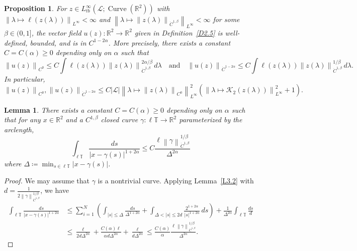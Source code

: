 \documentclass[reqno,centertags,12pt]{amsart}
\newtheorem{proposition}[theorem]{Proposition}
\newtheorem{lemma}[theorem]{Lemma}
\theoremstyle{definition}
\numberwithin{equation}{section}
\newcommand{\abs}[1]{\left\lvert#1\right\rvert}
\newcommand{\norm}[1]{\left\|#1\right\|}
\newcommand{\bbR}{{\mathbb{R}}}
\newcommand{\bbT}{{\mathbb{T}}}
\begin{document}
\begin{proposition}\label{P4.2}
    For $z\in L_{tb}^{\infty}(\mathcal{L};\operatorname{Curve}(\bbR^{2}))$ with
    $\norm{\lambda\mapsto\ell(z(\lambda))}_{L^{\infty}} < \infty$ and
    $\norm{\lambda\mapsto\norm{z(\lambda)}_{\dot{C}^{1,\beta}}}_{L^{\infty}} < \infty$
    for some $\beta\in(0,1]$, the vector field $u(z)\colon\bbR^{2}\to\bbR^{2}$ given in
    Definition~\ref{D2.5} is well-defined, bounded, and is in $C^{1-2\alpha}$.
    More precisely, there exists a constant $C=C(\alpha)\geq 0$
    depending only on $\alpha$ such that
    \[
        \norm{u(z)}_{C^{0}} \leq C\int\ell(z(\lambda))
        \norm{z(\lambda)}_{\dot{C}^{1,\beta}}^{2\alpha/\beta}\,d\lambda
        \quad\textrm{and}\quad
        \norm{u(z)}_{\dot{C}^{1-2\alpha}}
        \leq C\int\ell(z(\lambda))
        \norm{z(\lambda)}_{\dot{C}^{1,\beta}}^{1/\beta}\,d\lambda.
    \]
    In particular,
    \[
        \norm{u(z)}_{C^{0}}, \norm{u(z)}_{\dot{C}^{1-2\alpha}}
        \leq C\abs{\mathcal{L}}
        \norm{\lambda\mapsto\norm{z(\lambda)}_{C^{0}}}_{L^{\infty}}^{2}
        \left(
            \norm{\lambda\mapsto\mathcal{K}_{2}(z(\lambda))}_{L^{\infty}}^{2} + 1
        \right).
    \]
\end{proposition}

\begin{lemma}\label{L4.3}
    There exists a constant $C=C(\alpha)\geq 0$ depending only on $\alpha$ such that
    for any $x\in\bbR^{2}$ and a $C^{1,\beta}$ closed curve
    $\gamma\colon\ell\bbT\to\bbR^{2}$ parameterized by the arclength,
    \[
        \int_{\ell\bbT}\frac{ds}{\abs{x - \gamma(s)}^{1+2\alpha}}
        \leq C\frac{\ell\norm{\gamma}_{\dot{C}^{1,\beta}}^{1/\beta}}
        {\Delta^{2\alpha}}
    \]
    where $\Delta \coloneqq \min_{s\in\ell\bbT}\abs{x - \gamma(s)}$.
\end{lemma}

\begin{proof}
    We may assume that $\gamma$ is a nontrivial curve.
    Applying Lemma~\ref{L3.2} with
    $d = \frac{1}{2\norm{\gamma}_{\dot{C}^{1,\beta}}^{1/\beta}}$, we have
    \begin{align*}
        \int_{\ell\bbT}\frac{ds}{\abs{x - \gamma(s)}^{1+2\alpha}}
        &\leq \sum_{i=1}^{N}\left(
            \int_{\abs{s}\leq \Delta}\frac{ds}{\Delta^{1+2\alpha}}
            + \int_{\Delta<\abs{s}\leq 2d}\frac{2^{1+2\alpha}}{\abs{s}^{1+2\alpha}}\,ds
        \right)
        + \frac{1}{\Delta^{2\alpha}}\int_{\ell\bbT}\frac{ds}{d} \\
        &\leq \frac{\ell}{2d\Delta^{2\alpha}}
        + \frac{C(\alpha)\ell}{\alpha d\Delta^{2\alpha}}
        + \frac{\ell}{d\Delta^{2\alpha}}
        \leq \frac{C(\alpha)}{\alpha}
        \frac{\ell\norm{\gamma}_{\dot{C}^{1,\beta}}^{1/\beta}}{\Delta^{2\alpha}}.
    \end{align*}
\end{proof}
\end{document}
